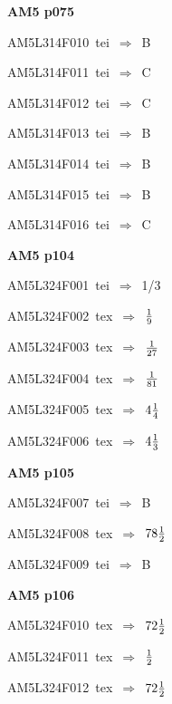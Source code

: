 \par\vfill\eject
{\bf\hfill AM5 p075\hfill\hbox{}}\par\bigskip
{\sixrm AM5L314F010\ {\sixit tei}\ }$\Rightarrow$\ B\par\smallskip
{\sixrm AM5L314F011\ {\sixit tei}\ }$\Rightarrow$\ C\par\smallskip
{\sixrm AM5L314F012\ {\sixit tei}\ }$\Rightarrow$\ C\par\smallskip
{\sixrm AM5L314F013\ {\sixit tei}\ }$\Rightarrow$\ B\par\smallskip
{\sixrm AM5L314F014\ {\sixit tei}\ }$\Rightarrow$\ B\par\smallskip
{\sixrm AM5L314F015\ {\sixit tei}\ }$\Rightarrow$\ B\par\smallskip
{\sixrm AM5L314F016\ {\sixit tei}\ }$\Rightarrow$\ C\par\smallskip

\par\vfill\eject
{\bf\hfill AM5 p104\hfill\hbox{}}\par\bigskip
{\sixrm AM5L324F001\ {\sixit tei}\ }$\Rightarrow$\ 1/3\par\smallskip
{\sixrm AM5L324F002\ {\sixit tex}\ }$\Rightarrow$\ ${1\over 9}$\par\smallskip
{\sixrm AM5L324F003\ {\sixit tex}\ }$\Rightarrow$\ ${1\over 27}$\par\smallskip
{\sixrm AM5L324F004\ {\sixit tex}\ }$\Rightarrow$\ ${1\over 81}$\par\smallskip
{\sixrm AM5L324F005\ {\sixit tex}\ }$\Rightarrow$\ $4 {1\over 4}$\par\smallskip
{\sixrm AM5L324F006\ {\sixit tex}\ }$\Rightarrow$\ $4 {1\over 3}$\par\smallskip

\par\vfill\eject
{\bf\hfill AM5 p105\hfill\hbox{}}\par\bigskip
{\sixrm AM5L324F007\ {\sixit tei}\ }$\Rightarrow$\ B\par\smallskip
{\sixrm AM5L324F008\ {\sixit tex}\ }$\Rightarrow$\ $78 {1\over 2}$\par\smallskip
{\sixrm AM5L324F009\ {\sixit tei}\ }$\Rightarrow$\ B\par\smallskip

\par\vfill\eject
{\bf\hfill AM5 p106\hfill\hbox{}}\par\bigskip
{\sixrm AM5L324F010\ {\sixit tex}\ }$\Rightarrow$\ $72 {1\over 2}$\par\smallskip
{\sixrm AM5L324F011\ {\sixit tex}\ }$\Rightarrow$\ ${1\over 2}$\par\smallskip
{\sixrm AM5L324F012\ {\sixit tex}\ }$\Rightarrow$\ $72 {1\over 2}$\par\smallskip

